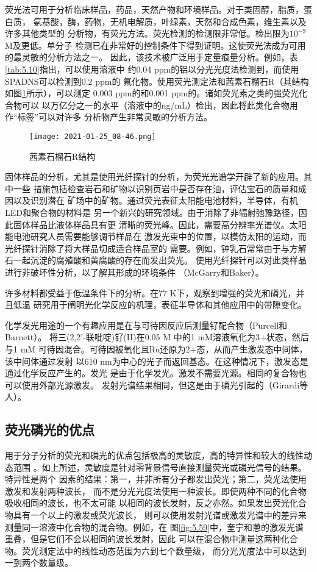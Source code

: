 荧光法可用于分析临床样品，药品，天然产物和环境样品。对于类固醇，脂质，蛋白质，
氨基酸，酶，药物，无机电解质，叶绿素，天然和合成色素，维生素以及许多其他类型的
分析物，有荧光方法。荧光检测的检测限非常低。检出限为$10^{-9}$ M及更低。单分子
检测已在非常好的控制条件下得到证明。这使荧光法成为可用的最灵敏的分析方法之一。
因此，该技术被广泛用于定量痕量分析。例如，表\ref{tab:5.10}指出，可以使用溶液中
约0.04 ppm的铝以分光光度法检测到，而使用SPADNS可以检测到0.2 ppm的
氟化物。使用荧光测定法和茜素石榴石R（其结构如图\ref{fig:5.60}所示），可以测定
0.003 ppm的和0.001 ppm的。诸如荧光素之类的强荧光化合物可以
以万亿分之一的水平（溶液中的ng/mL）检出，因此将此类化合物用作“标签”可以对许多
分析物产生非常灵敏的分析方法。
\begin{figure}[htpb]
    \centering
    \texttt{[image: 2021-01-25\_08-46.png]}
    \caption{茜素石榴石R结构}
    \label{fig:5.60}
\end{figure}

固体样品的分析，尤其是使用光纤探针的分析，为荧光光谱学开辟了新的应用。其中一些
措施包括检查岩石和矿物以识别页岩中是否存在油，评估宝石的质量和成因以及识别潜在
矿场中的矿物。通过荧光表征太阳能电池材料，半导体，有机LED和聚合物的材料是
另一个新兴的研究领域。由于消除了非辐射弛豫路径，因此固体样品比液体样品具有更
清晰的荧光峰。因此，需要高分辨率光谱仪。太阳能电池研究人员需要能够调节样品在
激发光束中的位置，以模仿太阳的运动，而光纤探针消除了将大样品切成适合样品室的
需要。例如，钟乳石常常由于与方解石一起沉淀的腐殖酸和黄腐酸的存在而发出荧光。
使用光纤探针可以对此类样品进行非破坏性分析，以了解其形成的环境条件
（McGarry和Baker）。

许多材料都受益于低温条件下的分析。在77 K下，观察到增强的荧光和磷光，并且低温
研究用于阐明光化学反应的机理，表征半导体和其他应用中的带隙变化。

化学发光用途的一个有趣应用是在与可待因反应后测量钌配合物（Purcell和Barnett）。
将三(2,2'-联吡啶)钌(II)在0.05 M 中的1 mM溶液氧化为3+状态，然后与1 mM
可待因混合。可待因被氧化且Ru还原为2+态，从而产生激发态中间体，该中间体通过发射
以610 nm为中心的光子而返回基态。在这种情况下，激发态是通过化学反应产生的。发光
是由于化学发光。激发不需要光源。相同的复合物也可以使用外部光源激发。
发射光谱结果相同，但这是由于磷光引起的（Girardi等人）。
\subsection{荧光磷光的优点}
用于分子分析的荧光和磷光的优点包括极高的灵敏度，高的特异性和较大的线性动态范围
。如上所述，灵敏度是针对零背景信号直接测量荧光或磷光信号的结果。特异性是两个
因素的结果：第一，并非所有分子都发出荧光；第二，荧光法使用激发和发射两种波长，
而不是分光光度法使用一种波长。即使两种不同的化合物吸收相同的波长，也不太可能
以相同的波长发射，反之亦然。如果发出荧光化合物具有一个以上的激发或荧光波长，
则可以使用发射光谱或激发光谱中的差异来测量同一溶液中化合物的混合物。例如，在
图\ref{fig:5.59}中，奎宁和蒽的激发光谱重叠，但是它们不会以相同的波长发射，因此
可以在混合物中测量这两种化合物。荧光测定法中的线性动态范围为六到七个数量级，
而分光光度法中可以达到一到两个数量级。
